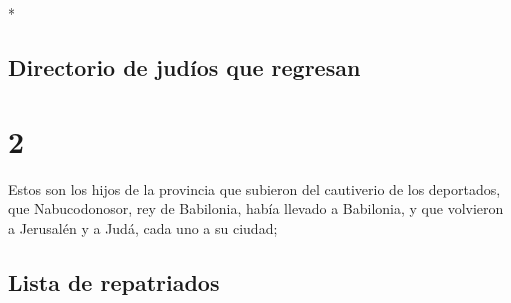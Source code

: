 \begin{paracol}{2}
\begin{otherlanguage}{english}
\end{otherlanguage}

\switchcolumn[0]*

\hypertarget{directorio-de-juduxedos-que-regresan}{%
\subsection{Directorio de judíos que
regresan}\label{directorio-de-juduxedos-que-regresan}}

\hypertarget{section-2}{%
\section{2}\label{section-2}}

 Estos son los hijos de la provincia que subieron del
cautiverio de los deportados, que Nabucodonosor, rey de Babilonia, había
llevado a Babilonia, y que volvieron a Jerusalén y a Judá, cada uno a su
ciudad;

\hypertarget{lista-de-repatriados}{%
\subsection{Lista de repatriados}\label{lista-de-repatriados}}


\end{paracol}

